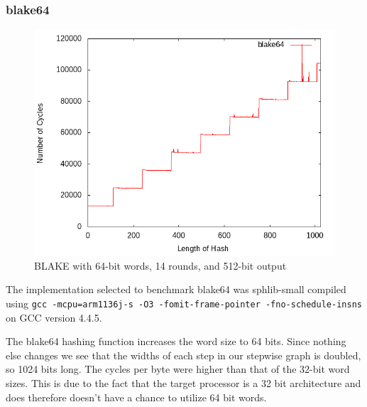 \documentclass[10pt,a4paper]{article}
\begin{document}
\subsubsection{blake64}
    \begin{figure}[H]
        \begin{center}
            \includegraphics[scale=0.5]{images_fast_run/blake64.png} 
            \caption{BLAKE with 64-bit words, 14 rounds, and 512-bit output }
        \end{center}
    \end{figure}

The implementation selected to benchmark blake64 was sphlib-small compiled using
\texttt{gcc -mcpu=arm1136j-s -O3 -fomit-frame-pointer -fno-schedule-insns} on
GCC version 4.4.5.

The blake64 hashing function increases the word size to 64 bits. Since nothing else changes we see that the widths of each step in our 
stepwise graph is doubled, so 1024 bits long. The cycles per byte were higher than that of the 32-bit word sizes. This is due to the 
fact that the target processor is a 32 bit architecture and does therefore doesn't have a chance to utilize 64 bit words. 
\end{document}

